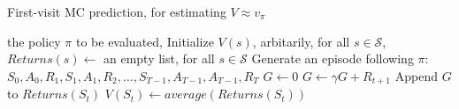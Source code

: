 \begin{algorithm}[H]
\label{alg:first-visit_mc_prediction}
\caption{First-visit MC prediction, for estimating $V \approx v_{\pi}$}
\begin{algorithmic}[1]
\Require the policy $\pi$ to be evaluated, Initialize $V(s)$, arbitarily, for all $s \in \mathcal{S}$, $Returns(s) \leftarrow $ an empty list, for all $s \in \mathcal{S}$
\Statex
\Loop {}
	\State Generate an episode following $\pi$:$S_0, A_0, R_1, S_1, A_1, R_2, \dots, S_{T-1}, A_{T-1}, A_{T-1}, R_T$
	\State $G \leftarrow 0$
		\State $G \leftarrow \gamma G + R_{t+1}$
		 
			\State Append $G$ to $Returns(S_t)$
			\State $V(S_t) \leftarrow average(Returns(S_t))$
		\EndIf
	\EndFor
\EndLoop
\end{algorithmic}
\end{algorithm}

